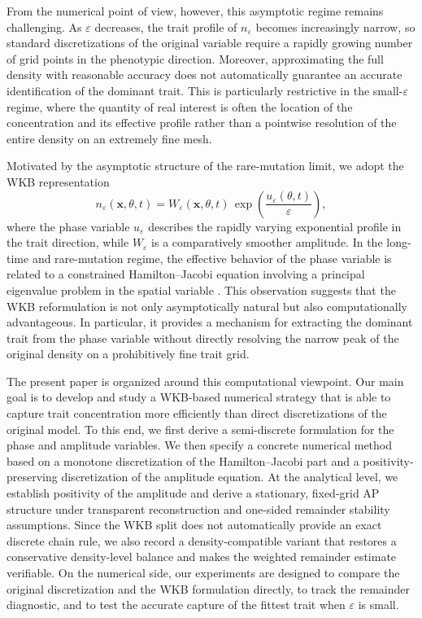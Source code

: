 \documentclass[11pt]{article}
\begin{document}
From the numerical point of view, however, this asymptotic regime remains challenging. As $\varepsilon$ decreases, the trait profile of $n_\varepsilon$ becomes increasingly narrow, so standard discretizations of the original variable require a rapidly growing number of grid points in the phenotypic direction. Moreover, approximating the full density with reasonable accuracy does not automatically guarantee an accurate identification of the dominant trait. This is particularly restrictive in the small-$\varepsilon$ regime, where the quantity of real interest is often the location of the concentration and its effective profile rather than a pointwise resolution of the entire density on an extremely fine mesh.

Motivated by the asymptotic structure of the rare-mutation limit, we adopt the WKB representation
\[
n_\varepsilon(\mathbf{x},\theta,t)
=
W_\varepsilon(\mathbf{x},\theta,t)\,
\exp\!\left(\frac{u_\varepsilon(\theta,t)}{\varepsilon}\right),
\]
where the phase variable $u_\varepsilon$ describes the rapidly varying exponential profile in the trait direction, while $W_\varepsilon$ is a comparatively smoother amplitude. In the long-time and rare-mutation regime, the effective behavior of the phase variable is related to a constrained Hamilton--Jacobi equation involving a principal eigenvalue problem in the spatial variable \cite{PerthameSouganidis,AlmeidaPerthameRuan}. This observation suggests that the WKB reformulation is not only asymptotically natural but also computationally advantageous. In particular, it provides a mechanism for extracting the dominant trait from the phase variable without directly resolving the narrow peak of the original density on a prohibitively fine trait grid.

The present paper is organized around this computational viewpoint. Our main goal is to develop and study a WKB-based numerical strategy that is able to capture trait concentration more efficiently than direct discretizations of the original model. To this end, we first derive a semi-discrete formulation for the phase and amplitude variables. We then specify a concrete numerical method based on a monotone discretization of the Hamilton--Jacobi part and a positivity-preserving discretization of the amplitude equation. At the analytical level, we establish positivity of the amplitude and derive a stationary, fixed-grid AP structure under transparent reconstruction and one-sided remainder stability assumptions. Since the WKB split does not automatically provide an exact discrete chain rule, we also record a density-compatible variant that restores a conservative density-level balance and makes the weighted remainder estimate verifiable. On the numerical side, our experiments are designed to compare the original discretization and the WKB formulation directly, to track the remainder diagnostic, and to test the accurate capture of the fittest trait when $\varepsilon$ is small.
\end{document}

